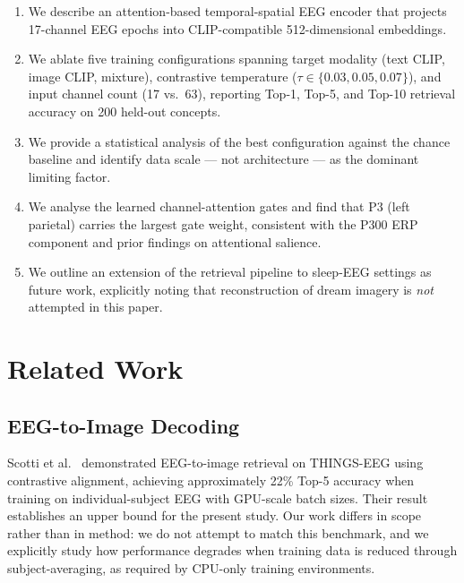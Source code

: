 \documentclass[conference]{IEEEtran}
\begin{document}
\begin{enumerate}
  \item We describe an attention-based
  temporal-spatial EEG encoder that projects
  17-channel EEG epochs into CLIP-compatible
  512-dimensional embeddings.

  \item We ablate five training configurations
  spanning target modality (text CLIP, image
  CLIP, mixture), contrastive temperature
  ($\tau \in \{0.03, 0.05, 0.07\}$), and
  input channel count (17 vs.\ 63), reporting
  Top-1, Top-5, and Top-10 retrieval accuracy
  on 200 held-out concepts.

  \item We provide a statistical analysis of
  the best configuration against the chance
  baseline and identify data scale --- not
  architecture --- as the dominant limiting
  factor.

  \item We analyse the learned channel-attention
  gates and find that P3 (left parietal)
  carries the largest gate weight, consistent
  with the P300 ERP component and prior
  findings on attentional salience.

  \item We outline an extension of the retrieval
  pipeline to sleep-EEG settings as future
  work, explicitly noting that reconstruction
  of dream imagery is \emph{not} attempted in
  this paper.
\end{enumerate}

\section{Related Work}

\subsection{EEG-to-Image Decoding}
Scotti et al.~\cite{scotti2023} demonstrated
EEG-to-image retrieval on THINGS-EEG using
contrastive alignment, achieving approximately
22\% Top-5 accuracy when training on
individual-subject EEG with GPU-scale batch
sizes. Their result establishes an upper
bound for the present study. Our work differs
in scope rather than in method: we do not
attempt to match this benchmark, and we
explicitly study how performance degrades
when training data is reduced through
subject-averaging, as required by
CPU-only training environments.
\end{document}
